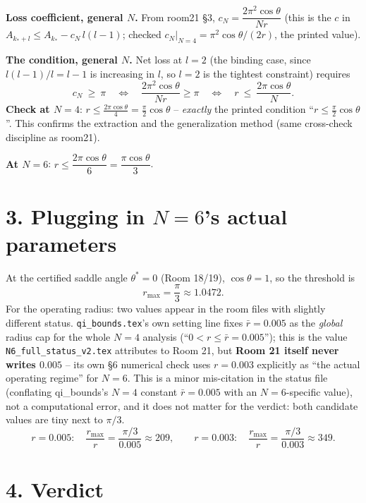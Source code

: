 \documentclass[11pt]{article}
\begin{document}
\textbf{Loss coefficient, general $N$.} From room21 \S3, $c_N=\dfrac{2\pi^2\cos\theta}{Nr}$ (this
is the $c$ in $A_{k_*+l}\le A_{k_*}-c_N\,l(l-1)$; checked $c_N|_{N=4}=\pi^2\cos\theta/(2r)$, the
printed value).

\textbf{The condition, general $N$.} Net loss at $l=2$ (the binding case, since $l(l-1)/l=l-1$ is
increasing in $l$, so $l=2$ is the tightest constraint) requires
\[
  c_N\ \ge\ \pi \quad\Longleftrightarrow\quad \frac{2\pi^2\cos\theta}{Nr}\ge\pi
  \quad\Longleftrightarrow\quad \boxed{r\ \le\ \frac{2\pi\cos\theta}N}.
\]
\textbf{Check at $N=4$}: $r\le\frac{2\pi\cos\theta}4=\frac\pi2\cos\theta$ -- \emph{exactly} the
printed condition ``$r\le\frac\pi2\cos\theta$''. This confirms the extraction and the
generalization method (same cross-check discipline as room21).

\textbf{At $N=6$}: $r\le\dfrac{2\pi\cos\theta}6=\dfrac{\pi\cos\theta}3$.

\section*{3. Plugging in $N=6$'s actual parameters}

At the certified saddle angle $\theta^*=0$ (Room 18/19), $\cos\theta=1$, so the threshold is
\[
  r_{\max}=\frac\pi3\approx1.0472.
\]
For the operating radius: two values appear in the room files with slightly different status.
\texttt{qi\_bounds.tex}'s own setting line fixes $\bar r=0.005$ as the \emph{global} radius cap
for the whole $N=4$ analysis (``$0<r\le\bar r=0.005$''); this is the value \texttt{N6\_full\_status\_v2.tex}
attributes to Room 21, but \textbf{Room 21 itself never writes $0.005$} -- its own \S6 numerical
check uses $r=0.003$ explicitly as ``the actual operating regime'' for $N=6$. This is a minor
mis-citation in the status file (conflating qi\_bounds's $N=4$ constant $\bar r=0.005$ with an
$N=6$-specific value), not a computational error, and it does not matter for the verdict: both
candidate values are tiny next to $\pi/3$.
\[
  r=0.005:\quad \frac{r_{\max}}r=\frac{\pi/3}{0.005}\approx209,
  \qquad
  r=0.003:\quad \frac{r_{\max}}r=\frac{\pi/3}{0.003}\approx349.
\]

\section*{4. Verdict}
\end{document}
